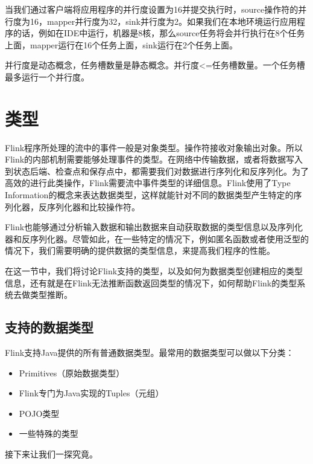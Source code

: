 \documentclass[cn,11pt,chinese]{elegantbook}
\providecommand{\tightlist}{%
  \setlength{\itemsep}{0pt}\setlength{\parskip}{0pt}}
\renewenvironment{quote}{\begin{customblockquote}\list{}{\rightmargin=0em\leftmargin=0em}%
\item\relax\color{blockquote-text}\ignorespaces}{\unskip\unskip\endlist\end{customblockquote}}
\begin{document}
当我们通过客户端将应用程序的并行度设置为16并提交执行时，source操作符的并行度为16，mapper并行度为32，sink并行度为2。如果我们在本地环境运行应用程序的话，例如在IDE中运行，机器是8核，那么source任务将会并行执行在8个任务上面，mapper运行在16个任务上面，sink运行在2个任务上面。

\begin{quote}
并行度是动态概念，任务槽数量是静态概念。并行度\textless=任务槽数量。一个任务槽最多运行一个并行度。
\end{quote}

\hypertarget{ux7c7bux578b}{%
\section{类型}\label{ux7c7bux578b}}

Flink程序所处理的流中的事件一般是对象类型。操作符接收对象输出对象。所以Flink的内部机制需要能够处理事件的类型。在网络中传输数据，或者将数据写入到状态后端、检查点和保存点中，都需要我们对数据进行序列化和反序列化。为了高效的进行此类操作，Flink需要流中事件类型的详细信息。Flink使用了Type
Information的概念来表达数据类型，这样就能针对不同的数据类型产生特定的序列化器，反序列化器和比较操作符。

Flink也能够通过分析输入数据和输出数据来自动获取数据的类型信息以及序列化器和反序列化器。尽管如此，在一些特定的情况下，例如匿名函数或者使用泛型的情况下，我们需要明确的提供数据的类型信息，来提高我们程序的性能。

在这一节中，我们将讨论Flink支持的类型，以及如何为数据类型创建相应的类型信息，还有就是在Flink无法推断函数返回类型的情况下，如何帮助Flink的类型系统去做类型推断。

\hypertarget{ux652fux6301ux7684ux6570ux636eux7c7bux578b}{%
\subsection{支持的数据类型}\label{ux652fux6301ux7684ux6570ux636eux7c7bux578b}}

Flink支持Java提供的所有普通数据类型。最常用的数据类型可以做以下分类：

\begin{itemize}
\tightlist
\item
  Primitives（原始数据类型）
\item
  Flink专门为Java实现的Tuples（元组）
\item
  POJO类型
\item
  一些特殊的类型
\end{itemize}

接下来让我们一探究竟。
\end{document}
